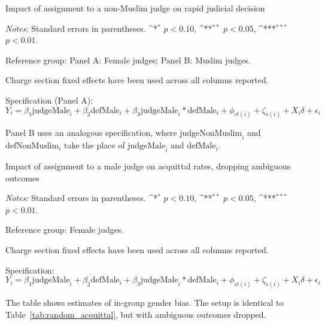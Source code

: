 \documentclass[12pt,english]{article}
\def\sym#1{\ifmmode^{#1}\else\(^{#1}\)\fi}
\newcommand{\HOME}{\string~}
\newcommand{\curpath}{\HOME/ddl/justice-overleaf}
\newcommand{\curpath}{.}
\begin{document}
\begin{appendices}
\begin{landscape}
\begin{table}
    \begin{center}
        \caption{Impact of assignment to a non-Muslim judge on rapid judicial decision}
        \label{tab:random_decision}
        
        \vspace{2mm}
        
    \end{center}
    \begin{minipage}{1.6\textwidth}
        \footnotesize 
        \emph{Notes:} Standard errors in parentheses. \sym{*} \(p<0.10\), \sym{**} \(p<0.05\), \sym{***} \(p<0.01\).  \par 
        Reference group: Panel A: Female judges; Panel B: Muslim judges.  \par
        Charge section fixed effects have been used across all columns reported. \par
        Specification (Panel A): $Y_{i} = \beta_{1} \text{judgeMale}_{i} + \beta_{2} \text{defMale}_{i} + \beta_{3} \text{judgeMale}_{i} * \text{defMale}_{i} + \phi_{ct(i)} + \zeta_{s(i)} + X_i \delta + \epsilon_{i}$  \par
        Panel B uses an analogous specification, where $\text{judgeNonMuslim}_i$ and $\text{defNonMuslim}_i$ take the place of $\text{judgeMale}_i$ and $\text{defMale}_i$.
   \end{minipage}
\end{table}

\begin{table}
  \begin{center}
     \caption{Impact of assignment to a male judge on acquittal rates, dropping ambiguous outcomes}
      \label{tab:amb_random_female}
     
    \end{center}
    \begin{minipage}{1.6\textwidth}
        \footnotesize 
        \emph{Notes:} Standard errors in parentheses. \sym{*} \(p<0.10\), \sym{**} \(p<0.05\), \sym{***} \(p<0.01\).  \par 
        Reference group: Female judges.  \par
        Charge section fixed effects have been used across all columns reported. \par
        Specification: $Y_{i} = \beta_{1} \text{judgeMale}_{i} + \beta_{2} \text{defMale}_{i} + \beta_{3} \text{judgeMale}_{i} * \text{defMale}_{i} + \phi_{ct(i)} + \zeta_{s(i)} + X_i \delta + \epsilon_{i}$ \par
        The table shows estimates of in-group gender bias. The setup is identical to Table~\ref{tab:random_acquittal}, but with ambiguous outcomes dropped.
   \end{minipage}
\end{table}


\end{landscape}
\end{appendices}
\end{document}
